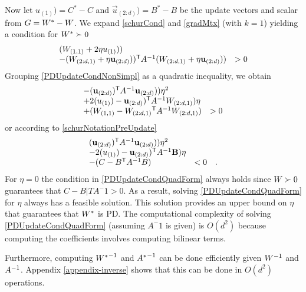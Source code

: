 \documentclass{article}
\begin{document}
{%
\newcommand{\uscalar}{u_{(1)})}
\newcommand{\uvec}{\vec{u}_{(2:d)})} 
\newcommand{\Wvec}{\W_{(2:d,1)}}

%
Now let $\uscalar = C^*-C$ and $\uvec = B^* - B$ be the update vectors
and scalar from $G = {{W^*}} - {W}$. We expand \eqref{schurCond} and
\eqref{gradMtx} (with $k=1$) yielding a condition for ${{W^*}} \succ 0$
\begin{equation}
  \begin{array}{ll} 
    (\W_{(1,1)} + 2\eta \uscalar) \\
    -(\W_{(2:d,1)} + \eta \uvec)\T \mat{A}^{-1} (\W_{(2:d,1)} + \eta \uvec)  & > 0
  \end{array}
  \label{PDUpdateCondNonSimpl}
\end{equation}
Grouping \eqref{PDUpdateCondNonSimpl} as a quadratic inequality, we obtain
\begin{equation}
  \begin{array}{ll} 
    -(\uvec\T \mat{A}^{-1} \uvec) \eta^2 \\
    +2(\uscalar - \uvec\T \mat{A}^{-1} \Wvec)\eta \\
    +(\W_{(1,1)} - \Wvec \T  \mat{A}^{-1} \Wvec) & > 0
  \end{array}
  \label{PDUpdateCondQuadFormWithW}
\end{equation}
or according to \eqref{schurNotationPreUpdate}
\begin{equation}
  \begin{array}{ll} 
    (\uvec\T \mat{A}^{-1} \uvec) \eta^2 \\
    -2(\uscalar - \uvec\T \mat{A}^{-1}\vec{B})\eta \\
    -(C - B\T  \mat{A}^{-1} B) & < 0 \quad .
  \end{array}
  \label{PDUpdateCondQuadForm}
\end{equation}
For $\eta = 0$ the condition in \eqref{PDUpdateCondQuadForm} always
holds since ${W} \succ 0$ guarantees that $C-B|TA^-1>0$. As a result,
solving \eqref{PDUpdateCondQuadForm} for $\eta$ always has a feasible
solution. This solution provides an upper bound on $\eta$ that
guarantees that ${{W^*}}$ is PD.  The computational complexity of
solving \eqref{PDUpdateCondQuadForm} (assuming $A^-1$ is given) is
$O(d^2)$ because computing the coefficients involves computing
bilinear terms.

Furthermore, computing ${{W^*}}^{-1}$ and ${A^*}^{-1}$ can be done
efficiently given ${W}^{-1}$ and ${A}^{-1}$. Appendix
\ref{appendix-inverse} shows that this can be done in $O(d^2)$
operations.


}
\end{document}
